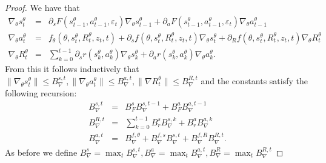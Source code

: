 \documentclass[reqno, 11pt]{amsart}%
\theoremstyle{definition}
\begin{document}
\begin{proof}
We have that 
\begin{eqnarray}\label{eq:nablas0}
\nabla_\theta s_t^\theta &=& \partial_sF(s_{t-1}^\theta,a_{t-1}^\theta,\varepsilon_t) \nabla_\theta s_{t-1}^\theta + \partial_aF(s_{t-1}^\theta,a_{t-1}^\theta,\varepsilon_t) \nabla_\theta a_{t-1}^\theta \\\label{eq:nablaa}
\nabla_\theta a_t^\theta &=& f_\theta(\theta,s_{t}^\theta,R_{t}^\theta,z_t,t)+ \partial_s f(\theta,s_{t}^\theta,R_{t}^\theta,z_t,t) \nabla_\theta s_{t}^\theta + \partial_R f(\theta,s_{t}^\theta,R_{t}^\theta,z_t,t) \nabla_\theta R_{t}^\theta\\
\nabla_\theta R_t^\theta &=& \sum_{k=0}^{t-1}  \partial_sr(s_k^\theta,a_k^\theta) \nabla_\theta s_k^\theta + \partial_ar(s_k^{\theta},a_k^{\theta}) \nabla_\theta a_k^\theta.
\end{eqnarray}
From this it follows inductively that $\|\nabla_\theta s_t^\theta\|\le B_\nabla^{s,t}, \|\nabla_\theta a_t^\theta\| \le B_\nabla^{a,t}, \|\nabla R_t^\theta\|\le B_\nabla^{R,t}$ and the constants satisfy the following recursion:
\begin{eqnarray*}
    B_\nabla^{s,t} &=& B_F^s B_\nabla^{s,t-1}+ B_F^a B_\nabla^{a,t-1}\\
    B_\nabla^{R,t} &=& \sum_{k=0}^{t-1} B_r^s B_\nabla^{s,k}+ B_r^a B_\nabla^{a,k}\\
    B_\nabla^{a,t} &=& B_\nabla^{f,\theta}+ B_\nabla^{f,s} B_\nabla^{s,t} + B_\nabla^{f,R}B_\nabla^{R,t}.
\end{eqnarray*}
As before we define $B_\nabla^{s}=\max_t B_\nabla^{s,t}, B_\nabla^{a} =\max_t B_\nabla^{a,t}, B_\nabla^{R}=\max_t B_\nabla^{R,t}$
\end{proof}
\end{document}
